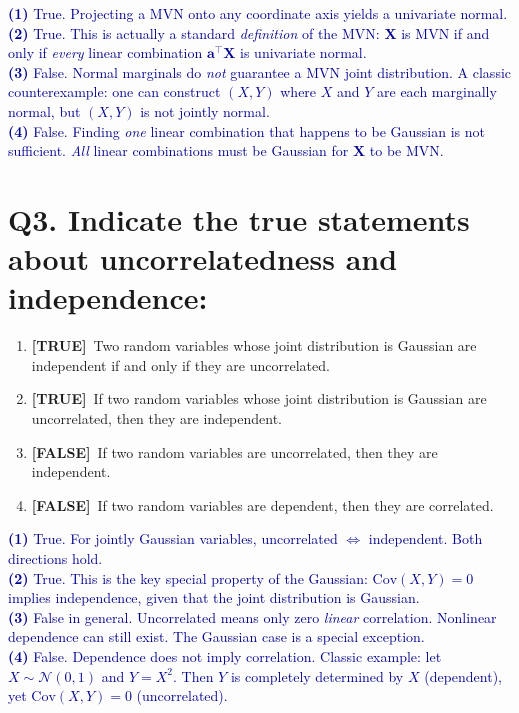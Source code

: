 \documentclass[12pt, a4paper]{article}
\newcommand{\T}{\textcolor{truegreen}{\textbf{[TRUE]}}}
\newcommand{\F}{\textcolor{falsered}{\textbf{[FALSE]}}}
\newcommand{\expl}[1]{\textcolor{darkblue}{\small #1}}
\begin{document}
\expl{
\textbf{(1)} True. Projecting a MVN onto any coordinate axis yields a univariate normal.\\
\textbf{(2)} True. This is actually a standard \textit{definition} of the MVN: $\mathbf{X}$ is MVN if and only if \textit{every} linear combination $\mathbf{a}^\top \mathbf{X}$ is univariate normal.\\
\textbf{(3)} False. Normal marginals do \textit{not} guarantee a MVN joint distribution. A classic counterexample: one can construct $(X, Y)$ where $X$ and $Y$ are each marginally normal, but $(X, Y)$ is not jointly normal.\\
\textbf{(4)} False. Finding \textit{one} linear combination that happens to be Gaussian is not sufficient. \textit{All} linear combinations must be Gaussian for $\mathbf{X}$ to be MVN.
}

\vspace{1.5em}

\section*{Q3. Indicate the true statements about uncorrelatedness and independence:}

\begin{enumerate}[label=(\arabic*)]
  \item \T\ Two random variables whose joint distribution is Gaussian are independent if and only if they are uncorrelated.
  \item \T\ If two random variables whose joint distribution is Gaussian are uncorrelated, then they are independent.
  \item \F\ If two random variables are uncorrelated, then they are independent.
  \item \F\ If two random variables are dependent, then they are correlated.
\end{enumerate}

\expl{
\textbf{(1)} True. For jointly Gaussian variables, uncorrelated $\Leftrightarrow$ independent. Both directions hold.\\
\textbf{(2)} True. This is the key special property of the Gaussian: $\mathrm{Cov}(X, Y) = 0$ implies independence, given that the joint distribution is Gaussian.\\
\textbf{(3)} False in general. Uncorrelated means only zero \textit{linear} correlation. Nonlinear dependence can still exist. The Gaussian case is a special exception.\\
\textbf{(4)} False. Dependence does not imply correlation. Classic example: let $X \sim \mathcal{N}(0,1)$ and $Y = X^2$. Then $Y$ is completely determined by $X$ (dependent), yet $\mathrm{Cov}(X, Y) = 0$ (uncorrelated).
}
\end{document}
